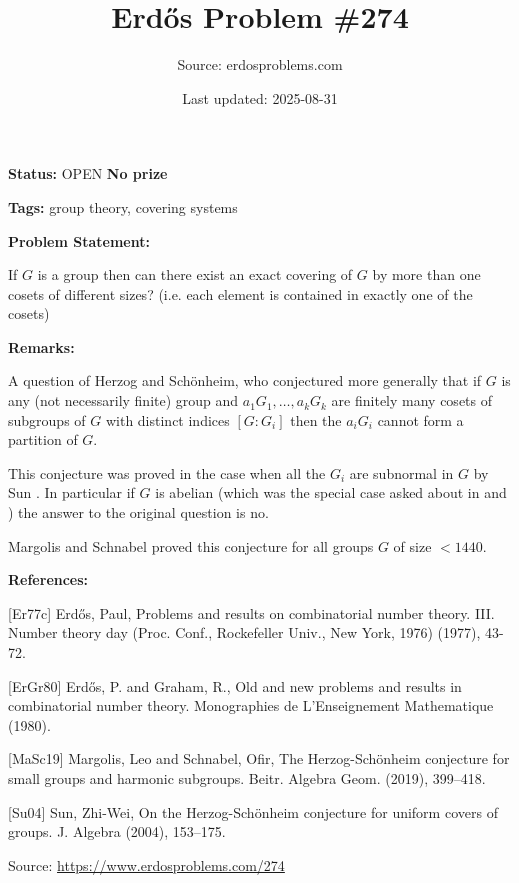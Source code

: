 \documentclass{article}
\title{Erd\H{o}s Problem \#274}
\date{Last updated: 2025-08-31}
\author{Source: erdosproblems.com}
\begin{document}
\maketitle

\noindent\textbf{Status:} OPEN \quad \textbf{No prize}

\noindent\textbf{Tags:} group theory, covering systems

\medskip
\noindent\textbf{Problem Statement:}

If $G$ is a group then can there exist an exact covering of $G$ by more than one cosets of different sizes? (i.e. each element is contained in exactly one of the cosets)

\bigskip
\noindent\textbf{Remarks:}

A question of Herzog and Sch\"{onheim}, who conjectured more generally that if $G$ is any (not necessarily finite) group and $a_1G_1,\ldots,a_kG_k$ are finitely many cosets of subgroups of $G$ with distinct indices $[G:G_i]$ then the $a_iG_i$ cannot form a partition of $G$.

This conjecture was proved in the case when all the $G_i$ are subnormal in $G$ by Sun \cite{Su04}. In particular if $G$ is abelian (which was the special case asked about in \cite{Er77c} and \cite{ErGr80}) the answer to the original question is no.

Margolis and Schnabel \cite{MaSc19} proved this conjecture for all groups $G$ of size $<1440$.

\bigskip
\noindent\textbf{References:}

[Er77c] Erd\H{o}s, Paul, Problems and results on combinatorial number theory. III. Number theory day (Proc. Conf., Rockefeller Univ.,
New York, 1976) (1977), 43-72.
 
 [ErGr80] Erd\H{o}s, P. and Graham, R., Old and new problems and results in combinatorial number theory. Monographies de L'Enseignement Mathematique (1980).
 
 [MaSc19] Margolis, Leo and Schnabel, Ofir, The {H}erzog-Sch\"onheim conjecture for small groups and
harmonic subgroups. Beitr. Algebra Geom. (2019), 399--418.
 
 [Su04] Sun, Zhi-Wei, On the {H}erzog-Sch\"onheim conjecture for uniform covers of
groups. J. Algebra (2004), 153--175.

\bigskip
\noindent\small{Source: \url{https://www.erdosproblems.com/274}}
\end{document}
